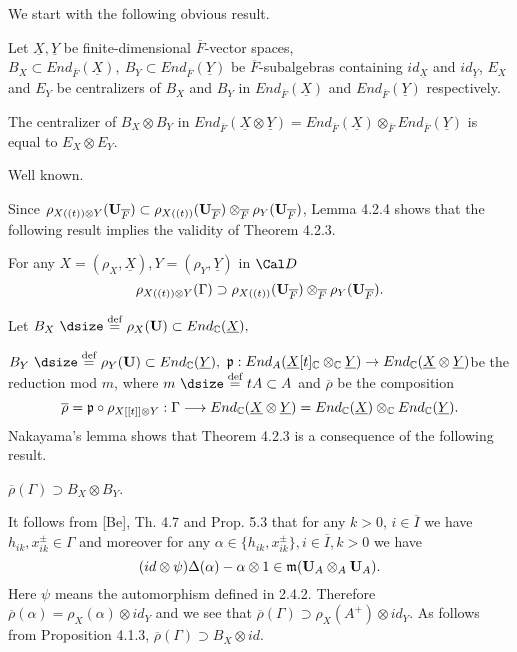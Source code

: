   We start with the following obvious result.
\enddemo

  Let  $\underline{X},\underline{Y}$  be finite-dimensional
$\overline{F}$-vector spaces,   $B_X \subset End_{\overline F}(\underline{X}),\
B_Y \subset
End_{\overline F}(\underline{Y})$  be ${\overline F}$-subalgebras containing
$id_{\underline X}$
and $id_{\underline Y}$,  $E_X$  and $E_Y$  be centralizers of $B_X$ and
$B_Y$  in  $End_{\overline{F}}(\underline{X})$  and $End_{\overline
F}(\underline{Y})$ respectively.

  The centralizer of  $B_X \otimes B_Y$  in
$End_{\overline F}(\underline{X} \otimes \underline{Y}) = End_{\overline
F}(\underline{X})
\otimes_{\overline F} End_{\overline F}(\underline{Y})$  is equal to $E_X
\otimes E_Y$.
\endproclaim

  Well known.
\enddemo

Since  $\rho_{X((t))\otimes Y}({\bold U}_{\overline F}) \subset
\rho_{X((t))}({\bold U}_{\overline F}) \otimes_{\overline F}
\rho_Y({\bold U}_{\overline F})$,  Lemma 4.2.4 shows that the following
result implies the validity of Theorem 4.2.3.

  For any  $X = (\rho_X, \underline{X}),
Y = (\rho_Y, \underline{Y})$  in ${\Cal D}$
$$
\rho_{X((t))\otimes Y}(\Gamma) \supset 	\rho_{X((t))}
({\bold U}_{\overline F})\otimes_{\overline F} \rho_Y({\bold U}_{\overline F}).
$$
\endproclaim

  Let
$B_X\ {\dsize\buildrel {\text{def}}\over =}\ \rho_X({\bold U}) \subset
End_{\Bbb C}(\underline{X}),$

\noindent
$B_Y\ {\dsize\buildrel {\text{def}}\over =}\
\rho_Y({\bold U}) \subset End_{\Bbb C}(\underline{Y}),$\quad
${\frak p}: End_A(\underline{X}[t]_{\Bbb C}
\otimes_{\Bbb C} \underline{Y}) \to End_{\Bbb C}(\underline{X} \otimes
\underline{Y})$\quad be the reduction mod $m$, where
$m\ {\dsize\buildrel{\text{def}}\over =}\ tA \subset A$  and $\overline{\rho}$
be the composition
$$
\overline{\rho} = {\frak p} \circ \rho_{X[[t]]\otimes Y}:
\Gamma \longrightarrow End_{\Bbb C}(\underline{X} \otimes \underline{Y})  =
End_{\Bbb C}(\underline{X}) \otimes_{\Bbb C} End_{\Bbb C}(\underline{Y}).
$$
Nakayama's lemma shows that Theorem 4.2.3 is a consequence of the following
result.

  $\overline{\rho}(\Gamma) \supset B_X \otimes B_Y$.
\endproclaim

     It follows from [Be], Th. 4.7 and
Prop. 5.3 that
for any $k > 0$, $i \in \overline{I}$  we have $h_{ik}, x^\pm_{ik} \in \Gamma$
and moreover for any $\alpha \in \{ h_{ik}, x^\pm_{ik}\}, i \in \overline{I},
k > 0$  we have
$$
(id \otimes \psi)\Delta(\alpha) - \alpha  \otimes 1 \in
{\frak m}({\bold U}_A \otimes_A {\bold U}_A).
$$
Here $\psi$  means the automorphism defined in 2.4.2.
Therefore  $\overline{\rho}(\alpha) = \rho_X(\alpha) \otimes id_Y$  and we
see that $\overline{\rho}(\Gamma) \supset \rho_X(A^+) \otimes id_Y$.
As follows from
Proposition 4.1.3, $\overline{\rho}(\Gamma) \supset B_X \otimes id$.

